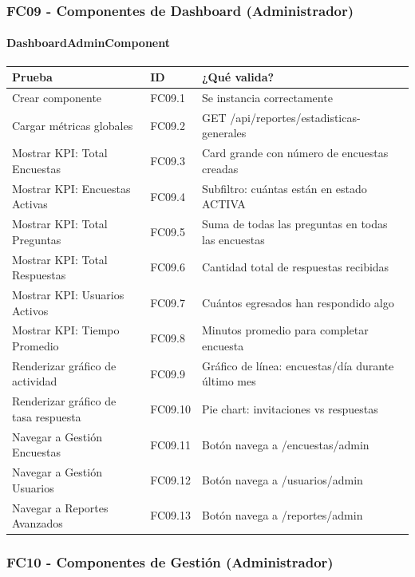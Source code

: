 \subsubsection{FC09 - Componentes de Dashboard (Administrador)}

\paragraph{DashboardAdminComponent}

\begin{table}[H]
\centering
\begin{tabular}{|l|l|p{6cm}|}
\hline
\textbf{Prueba} & \textbf{ID} & \textbf{¿Qué valida?} \\ \hline
Crear componente & FC09.1 & Se instancia correctamente \\ \hline
Cargar métricas globales & FC09.2 & GET /api/reportes/estadisticas-generales \\ \hline
Mostrar KPI: Total Encuestas & FC09.3 & Card grande con número de encuestas creadas \\ \hline
Mostrar KPI: Encuestas Activas & FC09.4 & Subfiltro: cuántas están en estado ACTIVA \\ \hline
Mostrar KPI: Total Preguntas & FC09.5 & Suma de todas las preguntas en todas las encuestas \\ \hline
Mostrar KPI: Total Respuestas & FC09.6 & Cantidad total de respuestas recibidas \\ \hline
Mostrar KPI: Usuarios Activos & FC09.7 & Cuántos egresados han respondido algo \\ \hline
Mostrar KPI: Tiempo Promedio & FC09.8 & Minutos promedio para completar encuesta \\ \hline
Renderizar gráfico de actividad & FC09.9 & Gráfico de línea: encuestas/día durante último mes \\ \hline
Renderizar gráfico de tasa respuesta & FC09.10 & Pie chart: invitaciones vs respuestas \\ \hline
Navegar a Gestión Encuestas & FC09.11 & Botón navega a /encuestas/admin \\ \hline
Navegar a Gestión Usuarios & FC09.12 & Botón navega a /usuarios/admin \\ \hline
Navegar a Reportes Avanzados & FC09.13 & Botón navega a /reportes/admin \\ \hline
\end{tabular}
\end{table}

\subsubsection{FC10 - Componentes de Gestión (Administrador)}

